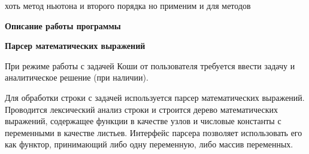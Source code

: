 хоть метод ньютона и второго порядка но применим и для методов

\textbf{Описание работы программы}


\textbf{Парсер математических выражений}

При режиме работы с задачей Коши от пользователя требуется ввести задачу и аналитическое решение (при наличии). 

Для обработки строки с задачей используется парсер математических выражений. Проводится лексический анализ строки и строится дерево
математических выражений, содержащее функции в качестве узлов и числовые константы с переменными в качестве листьев. Интерфейс парсера
позволяет использовать его как функтор, принимающий либо одну переменную, либо массив переменных. 





